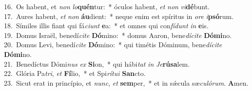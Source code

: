 {16.~}Os habent, et \textit{non} \textit{lo}\textbf{quén}tur:~* óculos habent, \textit{et} \textit{non} \textit{vi}\textbf{dé}bunt.\\
{17.~}Aures habent, \textit{et} \textit{non} \textbf{áu}dient:~* neque enim est spíritus in \textit{o}\textit{re} \textit{i}\textbf{psó}rum.\\
{18.~}Símiles illis fiant qui fá\textit{ci}\textit{unt} \textbf{e}a:~* et omnes qui con\textit{fí}\textit{dunt} \textit{in} \textbf{e}is.\\
{19.~}Domus Israël, benedí\textit{ci}\textit{te} \textbf{Dó}mino:~* domus Aaron, bene\textit{dí}\textit{ci}\textit{te} \textbf{Dó}\textbf{mi}no.\\
{20.~}Domus Levi, benedí\textit{ci}\textit{te} \textbf{Dó}mino:~* qui timétis Dóminum, bene\textit{dí}\textit{ci}\textit{te} \textbf{Dó}\textbf{mi}no.\\
{21.~}Benedíctus Dómi\textit{nus} \textit{ex} \textbf{Si}on,~* qui hábi\textit{tat} \textit{in} \textit{Je}\textbf{rú}\textbf{sa}lem.\\
{22.~}Glória Pa\textit{tri}, \textit{et} \textbf{Fí}lio,~* et Spi\textit{rí}\textit{tu}\textit{i} \textbf{San}cto.\\
{23.~}Sicut erat in princípio, et \textit{nunc}, \textit{et} \textbf{sem}per,~* et in sǽcula sæ\textit{cu}\textit{ló}\textit{rum}. \textbf{A}men.\\
